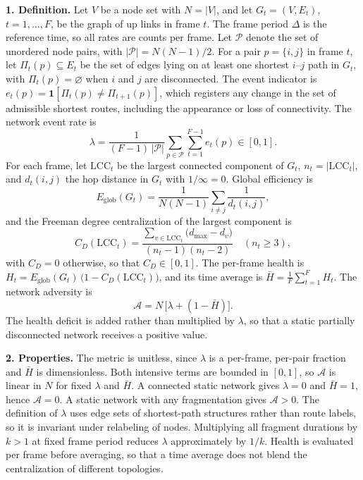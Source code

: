 \documentclass[10pt,a4paper]{article}
\begin{document}
\textbf{1. Definition.} Let $V$ be a node set with $N=|V|$, and let $G_t=(V,E_t)$, $t=1,\dots,F$, be the graph of up links in frame $t$. The frame period $\Delta$ is the reference time, so all rates are counts per frame. Let $\mathcal{P}$ denote the set of unordered node pairs, with $|\mathcal{P}|=N(N-1)/2$. For a pair $p=\{i,j\}$ in frame $t$, let $\Pi_t(p)\subseteq E_t$ be the set of edges lying on at least one shortest $i$--$j$ path in $G_t$, with $\Pi_t(p)=\varnothing$ when $i$ and $j$ are disconnected. The event indicator is $e_t(p)=\mathbf{1}[\Pi_t(p)\neq\Pi_{t+1}(p)]$, which registers any change in the set of admissible shortest routes, including the appearance or loss of connectivity. The network event rate is
\begin{equation}
\lambda=\frac{1}{(F-1)\,|\mathcal{P}|}\sum_{p\in\mathcal{P}}\sum_{t=1}^{F-1} e_t(p)\in[0,1].
\end{equation}
For each frame, let $\mathrm{LCC}_t$ be the largest connected component of $G_t$, $n_t=|\mathrm{LCC}_t|$, and $d_t(i,j)$ the hop distance in $G_t$ with $1/\infty=0$. Global efficiency is
\begin{equation}
E_{\mathrm{glob}}(G_t)=\frac{1}{N(N-1)}\sum_{i\neq j}\frac{1}{d_t(i,j)},
\end{equation}
and the Freeman degree centralization of the largest component is
\begin{equation}
C_D(\mathrm{LCC}_t)=\frac{\sum_{v\in \mathrm{LCC}_t}\big(d_{\max}-d_v\big)}{(n_t-1)(n_t-2)}\quad(n_t\ge 3),
\end{equation}
with $C_D=0$ otherwise, so that $C_D\in[0,1]$. The per-frame health is $H_t=E_{\mathrm{glob}}(G_t)\,\big(1-C_D(\mathrm{LCC}_t)\big)$, and its time average is $\bar{H}=\frac{1}{F}\sum_{t=1}^{F}H_t$. The network adversity is
\begin{equation}
\mathcal{A}=N\,\big[\lambda+(1-\bar{H})\big].
\end{equation}
The health deficit is added rather than multiplied by $\lambda$, so that a static partially disconnected network receives a positive value.

\textbf{2. Properties.} The metric is unitless, since $\lambda$ is a per-frame, per-pair fraction and $\bar{H}$ is dimensionless. Both intensive terms are bounded in $[0,1]$, so $\mathcal{A}$ is linear in $N$ for fixed $\lambda$ and $\bar{H}$. A connected static network gives $\lambda=0$ and $\bar{H}=1$, hence $\mathcal{A}=0$. A static network with any fragmentation gives $\mathcal{A}>0$. The definition of $\lambda$ uses edge sets of shortest-path structures rather than route labels, so it is invariant under relabeling of nodes. Multiplying all fragment durations by $k>1$ at fixed frame period reduces $\lambda$ approximately by $1/k$. Health is evaluated per frame before averaging, so that a time average does not blend the centralization of different topologies.
\end{document}
